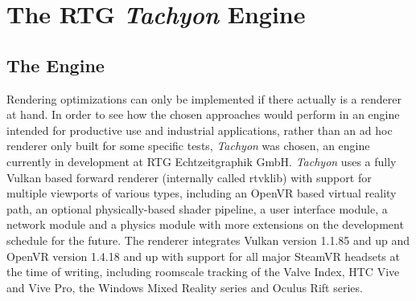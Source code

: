 
\chapter{The RTG \textit{Tachyon} Engine} \label{Tachyon}

\section{The Engine}
Rendering optimizations can only be implemented if there actually is a renderer at hand. In order to see how the chosen approaches would perform in an engine intended for productive use and industrial applications, rather than an ad hoc renderer only built for some specific tests, \textit{Tachyon} was chosen, an engine currently in development at RTG Echtzeitgraphik GmbH. \textit{Tachyon} uses a fully Vulkan based forward renderer (internally called rtvklib) with support for multiple viewports of various types, including an OpenVR based virtual reality path, an optional physically-based shader pipeline, a user interface module, a network module and a physics module with more extensions on the development schedule for the future. The renderer integrates Vulkan version 1.1.85 and up and OpenVR version 1.4.18 and up with support for all major SteamVR headsets at the time of writing, including roomscale tracking of the Valve Index, HTC Vive and Vive Pro, the Windows Mixed Reality series and Oculus Rift series. 


